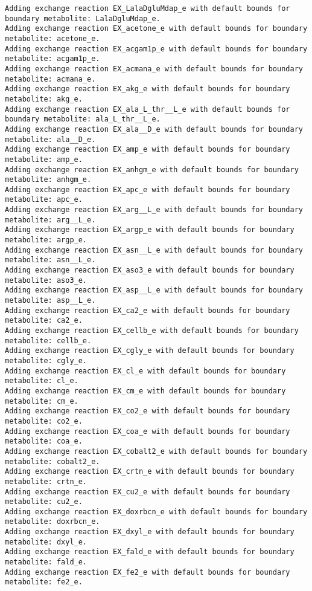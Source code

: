 \documentclass[
  letterpaper,
  DIV=11,
  numbers=noendperiod]{scrartcl}
\begin{document}
\begin{verbatim}
Adding exchange reaction EX_LalaDgluMdap_e with default bounds for boundary metabolite: LalaDgluMdap_e.
Adding exchange reaction EX_acetone_e with default bounds for boundary metabolite: acetone_e.
Adding exchange reaction EX_acgam1p_e with default bounds for boundary metabolite: acgam1p_e.
Adding exchange reaction EX_acmana_e with default bounds for boundary metabolite: acmana_e.
Adding exchange reaction EX_akg_e with default bounds for boundary metabolite: akg_e.
Adding exchange reaction EX_ala_L_thr__L_e with default bounds for boundary metabolite: ala_L_thr__L_e.
Adding exchange reaction EX_ala__D_e with default bounds for boundary metabolite: ala__D_e.
Adding exchange reaction EX_amp_e with default bounds for boundary metabolite: amp_e.
Adding exchange reaction EX_anhgm_e with default bounds for boundary metabolite: anhgm_e.
Adding exchange reaction EX_apc_e with default bounds for boundary metabolite: apc_e.
Adding exchange reaction EX_arg__L_e with default bounds for boundary metabolite: arg__L_e.
Adding exchange reaction EX_argp_e with default bounds for boundary metabolite: argp_e.
Adding exchange reaction EX_asn__L_e with default bounds for boundary metabolite: asn__L_e.
Adding exchange reaction EX_aso3_e with default bounds for boundary metabolite: aso3_e.
Adding exchange reaction EX_asp__L_e with default bounds for boundary metabolite: asp__L_e.
Adding exchange reaction EX_ca2_e with default bounds for boundary metabolite: ca2_e.
Adding exchange reaction EX_cellb_e with default bounds for boundary metabolite: cellb_e.
Adding exchange reaction EX_cgly_e with default bounds for boundary metabolite: cgly_e.
Adding exchange reaction EX_cl_e with default bounds for boundary metabolite: cl_e.
Adding exchange reaction EX_cm_e with default bounds for boundary metabolite: cm_e.
Adding exchange reaction EX_co2_e with default bounds for boundary metabolite: co2_e.
Adding exchange reaction EX_coa_e with default bounds for boundary metabolite: coa_e.
Adding exchange reaction EX_cobalt2_e with default bounds for boundary metabolite: cobalt2_e.
Adding exchange reaction EX_crtn_e with default bounds for boundary metabolite: crtn_e.
Adding exchange reaction EX_cu2_e with default bounds for boundary metabolite: cu2_e.
Adding exchange reaction EX_doxrbcn_e with default bounds for boundary metabolite: doxrbcn_e.
Adding exchange reaction EX_dxyl_e with default bounds for boundary metabolite: dxyl_e.
Adding exchange reaction EX_fald_e with default bounds for boundary metabolite: fald_e.
Adding exchange reaction EX_fe2_e with default bounds for boundary metabolite: fe2_e.

\end{verbatim}
\end{document}
